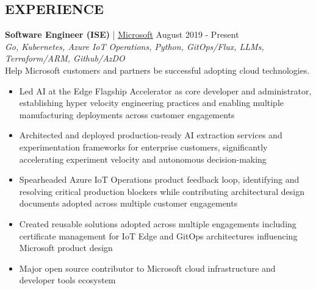 \documentclass[margin, 10pt, hidelinks]{res} %
\newcommand{\emphasize}{\bf} %
\begin{document}
\begin{resume}






    \section{EXPERIENCE}

     {\emphasize Software Engineer (ISE)} | \href{https://www.microsoft.com/}{\underline{Microsoft}}    \hfill August 2019 - Present  \\
    {\it Go, Kubernetes, Azure IoT Operations, Python, GitOps/Flux, LLMs, Terraform/ARM, Github/AzDO} \\ %
    Help Microsoft customers and partners be successful adopting cloud technologies.
    \begin{itemize} \setlength{\itemindent}{-0.1in}\itemsep 0pt %
        \item Led AI at the Edge Flagship Accelerator as core developer and administrator, establishing hyper velocity engineering practices and enabling multiple manufacturing deployments across customer engagements
        \item Architected and deployed production-ready AI extraction services and experimentation frameworks for enterprise customers, significantly accelerating experiment velocity and autonomous decision-making
        \item Spearheaded Azure IoT Operations product feedback loop, identifying and resolving critical production blockers while contributing architectural design documents adopted across multiple customer engagements
        \item Created reusable solutions adopted across multiple engagements including certificate management for IoT Edge and GitOps architectures influencing Microsoft product design
        \item Major open source contributor to Microsoft cloud infrastructure and developer tools ecosystem
    \end{itemize}


\end{resume}
\end{document}
